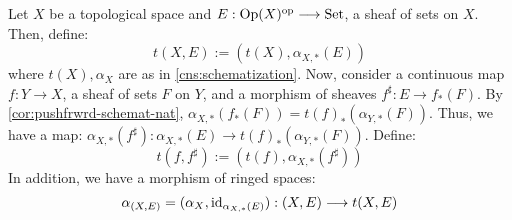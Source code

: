 \begin{cns}\label{cns:schematization-ringed-sp}
Let $X$ be a topological space and $E : \Op(X)^\op \to \Set$,
a sheaf of sets on $X$. Then, define:
\[
t(X, E) := (t(X), \alpha_{X, *}(E))
\]
where $t(X), \alpha_X$ are as in \cref{cns:schematization}.
Now, consider a continuous map $f : Y \to X$, a sheaf of sets
$F$ on $Y$, and a morphism of sheaves $f^\sharp : E \to f_*(F)$.
By \cref{cor:pushfrwrd-schemat-nat},
$\alpha_{X, *}(f_*(F)) = t(f)_*(\alpha_{Y, *}(F))$. Thus, we have a map:
$\alpha_{X, *}(f^\sharp) : \alpha_{X, *}(E) \to t(f)_*(\alpha_{Y, *}(F))$.
Define:
\[
t(f, f^\sharp) := (t(f), \alpha_{X, *}(f^\sharp))
\]
In addition, we have a morphism of ringed spaces:
\[
\alpha_{(X, E)} = (\alpha_X, \id_{\alpha_{X, *}(E)}) : (X, E) \to t(X, E)
\]
\end{cns}

